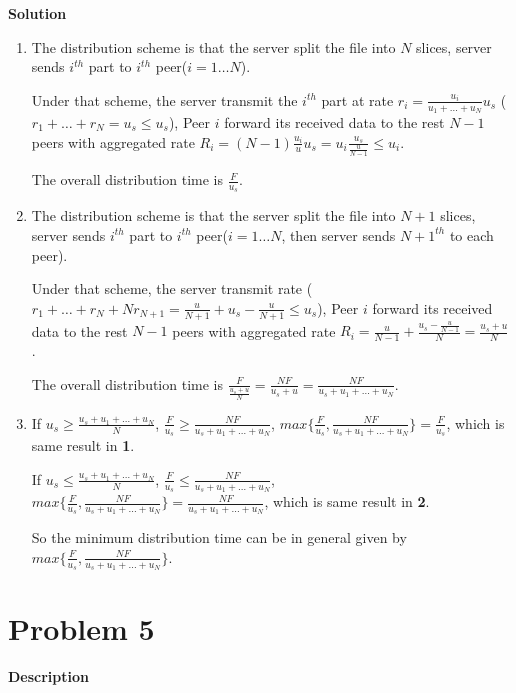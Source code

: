 \documentclass[12pt,letterpaper]{ctexart}
\begin{document}
{\bf Solution}

\begin{enumerate}
  \item The distribution scheme is that the server split the file into $N$ slices, server sends $i^{th}$ part to $i^{th}$ peer($i = 1 \dots N$).

  Under that scheme, the server transmit the $i^{th}$ part at rate $r_i = \frac{u_i}{u_1 + \dots + u_N}u_s$ ($r_1 + \dots + r_N = u_s \leq u_s$),
  Peer $i$ forward its received data to the rest $N - 1$ peers with aggregated rate $R_i = (N - 1) \frac{u_i}{u} u_s = u_i \frac{u_s}{\frac{u}{N - 1}} \leq u_i$.

  The overall distribution time is $\frac{F}{u_s}$.

  \item The distribution scheme is that the server split the file into $N + 1$ slices, server sends $i^{th}$ part to $i^{th}$ peer($i = 1 \dots N$, then server sends $N+1^{th}$ to each peer).

  Under that scheme, the server transmit rate ($r_1 + \dots + r_N + N r_{N+1} = \frac{u}{N + 1} + u_s - \frac{u}{N + 1} \leq u_s$),
  Peer $i$ forward its received data to the rest $N - 1$ peers with aggregated rate $R_i = \frac{u}{N - 1} + \frac{u_s - \frac{u}{N - 1}}{N} = \frac{u_s + u}{N}$.

  The overall distribution time is $\frac{F}{\frac{u_s + u}{N}} = \frac{NF}{u_s + u} = \frac{NF}{u_s + u_1 + \dots + u_N}$.

  \item If $u_s \geq \frac{u_s + u_1 + \dots + u_N}{N}$, $\frac{F}{u_s} \geq \frac{NF}{u_s + u_1 + \dots + u_N}$, $max \{\frac{F}{u_s}, \frac{NF}{u_s + u_1 + \dots + u_N}\} = \frac{F}{u_s}$, which is same result in {\bf 1}.

  If $u_s \leq \frac{u_s + u_1 + \dots + u_N}{N}$, $\frac{F}{u_s} \leq \frac{NF}{u_s + u_1 + \dots + u_N}$, $max \{\frac{F}{u_s}, \frac{NF}{u_s + u_1 + \dots + u_N}\} = \frac{NF}{u_s + u_1 + \dots + u_N}$, which is same result in {\bf 2}.

  So the minimum distribution time can be in general given by $max \{\frac{F}{u_s}, \frac{NF}{u_s + u_1 + \dots + u_N}\}$.
\end{enumerate}

\section*{Problem 5}
{\bf Description}
\end{document}
